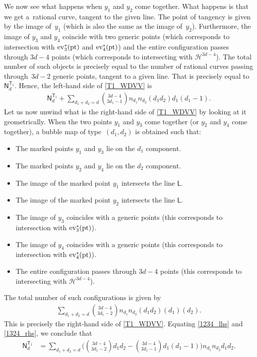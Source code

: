 \documentclass[pdftex]{sigma}
\numberwithin{equation}{section}
\begin{document}
We now see what happens when $y_1$ and $y_2$ come together.
What happens is that we get a~rational curve, tangent to the given line. The point of tangency is
given by the image of~$y_1$ (which is also the same as the image of~$y_2$).
Furthermore, the image of $y_3$ and $y_4$ coincide with two generic points
(which corresponds to intersection with
 ${\rm ev}_3^*(\textnormal{pt})$ and ${\rm ev}_4^*(\textnormal{pt})$)
and the entire configuration passes through $3d-4$ points
\big(which corresponds to intersecting with $\mathcal{H}^{3d-4}$\big). The total number of such objects is
precisely equal to the number of rational curves passing through~${3d-2}$ generic points, tangent to a given line.
That is precisely equal to $\mathsf{N}_d^{\mathsf{T}_1}$.
Hence, the left-hand side of \eqref{T1_WDVV} is
\begin{align}
\mathsf{N}_d^{\mathsf{T}_1}+\sum_{d_1+d_2 = d} \binom{3d-4}{3d_1-1} n_{d_1} n_{d_2} (d_1 d_2) d_1(d_1 -1). \label{1234_lhs}
\end{align}
Let us now unwind what is the
right-hand side of \eqref{T1_WDVV} by looking at it geometrically.
When the two points $y_1$ and $y_3$ come together (or $y_2$ and $y_4$ come together), a bubble
map of type~$(d_1, d_2)$ is obtained such that:
\begin{itemize}\itemsep=0pt
 \item The marked points $y_1$ and $y_3$ lie on the $d_1$ component.
 \item The marked points $y_2$ and $y_4$ lie on the $d_2$ component.
 \item The image of the marked point $y_1$ intersects the line $\mathsf{L}$.
\item The image of the marked point $y_2$ intersects the line $\mathsf{L}$.
\item The image of $y_3$ coincides with a generic points (this corresponds to intersection with ${\rm ev}_3^*(\textnormal{pt})$).
 \item The image of $y_4$ coincides with a generic points (this corresponds to intersection with
 ${\rm ev}_4^*(\textnormal{pt})$).
 \item The entire configuration passes through $3d-4$ points \big(this corresponds to intersecting with $\mathcal{H}^{3d-4}$\big).
\end{itemize}
The total number of such configurations is given by
\begin{align}
\sum_{d_1+d_2 = d} \binom{3d-4}{3d_1-2} n_{d_1} n_{d_2} (d_1 d_2) (d_1) (d_2). \label{1324_rhs}
\end{align}
This is precisely the right-hand side of \eqref{T1_WDVV}. Equating \eqref{1234_lhs} and \eqref{1324_rhs},
we conclude that
\begin{align}
\mathsf{N}_d^{\mathsf{T}_1}& =
\sum_{d_1+d_2 = d} \biggl(\binom{3d-4}{3d_1-2} d_1 d_2-\binom{3d-4}{3d_1-1}d_1(d_1-1)\biggr)
n_{d_1} n_{d_2} d_1 d_2.\label{NT1_WDVV_formula}
\end{align}
\end{document}

